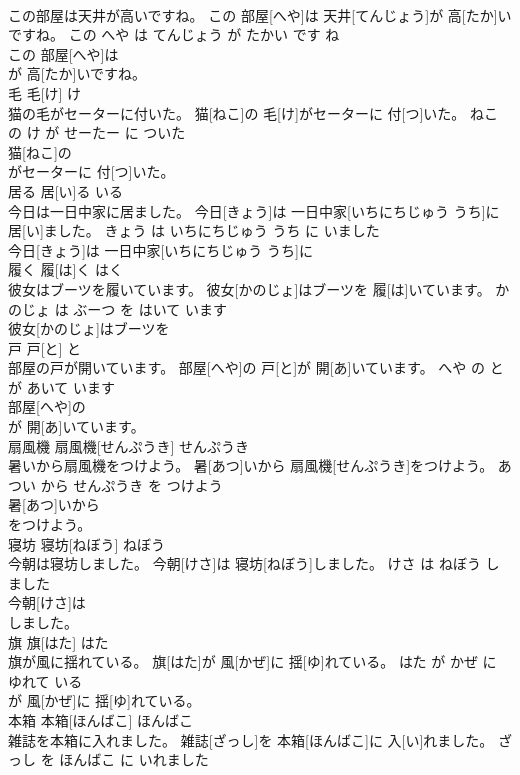 \documentclass[8pt]{extreport}
\begin{document}
\begin{CJK}{UTF8}{min}
\\	この部屋は天井が高いですね。	この 部屋[へや]は 天井[てんじょう]が 高[たか]いですね。	この へや は てんじょう が たかい です ね	
\\	この 部屋[へや]は
\\	が 高[たか]いですね。			
\\	毛	毛[け]	け	
\\	猫の毛がセーターに付いた。	猫[ねこ]の 毛[け]がセーターに 付[つ]いた。	ねこ の け が せーたー に ついた	
\\	猫[ねこ]の
\\	がセーターに 付[つ]いた。			
\\	居る	居[い]る	いる	
\\	今日は一日中家に居ました。	今日[きょう]は 一日中家[いちにちじゅう うち]に 居[い]ました。	きょう は いちにちじゅう うち に いました	
\\	今日[きょう]は 一日中家[いちにちじゅう うち]に
\\	履く	履[は]く	はく	
\\	彼女はブーツを履いています。	彼女[かのじょ]はブーツを 履[は]いています。	かのじょ は ぶーつ を はいて います	
\\	彼女[かのじょ]はブーツを
\\	戸	戸[と]	と	
\\	部屋の戸が開いています。	部屋[へや]の 戸[と]が 開[あ]いています。	へや の と が あいて います	
\\	部屋[へや]の
\\	が 開[あ]いています。			
\\	扇風機	扇風機[せんぷうき]	せんぷうき	
\\	暑いから扇風機をつけよう。	暑[あつ]いから 扇風機[せんぷうき]をつけよう。	あつい から せんぷうき を つけよう	
\\	暑[あつ]いから
\\	をつけよう。			
\\	寝坊	寝坊[ねぼう]	ねぼう	
\\	今朝は寝坊しました。	今朝[けさ]は 寝坊[ねぼう]しました。	けさ は ねぼう しました	
\\	今朝[けさ]は
\\	しました。			
\\	旗	旗[はた]	はた	
\\	旗が風に揺れている。	旗[はた]が 風[かぜ]に 揺[ゆ]れている。	はた が かぜ に ゆれて いる	
\\	が 風[かぜ]に 揺[ゆ]れている。			
\\	本箱	本箱[ほんばこ]	ほんばこ	
\\	雑誌を本箱に入れました。	雑誌[ざっし]を 本箱[ほんばこ]に 入[い]れました。	ざっし を ほんばこ に いれました	

\end{CJK}
\end{document}
